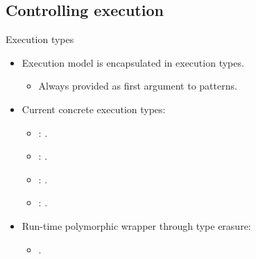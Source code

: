 \subsection{Controlling execution}

\begin{frame}[t]{Execution types}
\begin{itemize}
  \item Execution model is encapsulated in execution types.
    \begin{itemize}
      \item Always provided as first argument to patterns.
    \end{itemize}

  \vfill
  \item Current concrete execution types:
    \begin{itemize}
      \item {}: .
      \item {}: .
      \item {}: .
      \item {}: .
    \end{itemize}

  \vfill
  \item Run-time polymorphic wrapper through type erasure:
    \begin{itemize}
      \item {}.
    \end{itemize}
\end{itemize}
\end{frame}

